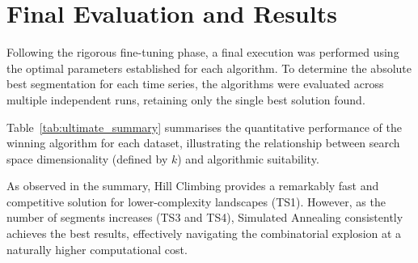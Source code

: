 \documentclass[12pt, a4paper]{article}
\begin{document}
\section{Final Evaluation and Results}

Following the rigorous fine-tuning phase, a final execution was performed using the
optimal parameters established for each algorithm. To determine the absolute best
segmentation for each time series, the algorithms were evaluated across multiple
independent runs, retaining only the single best solution found.

Table~\ref{tab:ultimate_summary} summarises the quantitative performance of the winning
algorithm for each dataset, illustrating the relationship between search space
dimensionality (defined by $k$) and algorithmic suitability.

\renewcommand{\arraystretch}{1.3}
\begin{table}[H]
  \centering
  \caption{Summary of the best solutions found across all datasets.}
  \label{tab:ultimate_summary}
\end{table}
\renewcommand{\arraystretch}{1}

As observed in the summary, Hill Climbing provides a remarkably fast and competitive
solution for lower-complexity landscapes (TS1). However, as the number of segments
increases (TS3 and TS4), Simulated Annealing consistently achieves the best results,
effectively navigating the combinatorial explosion at a naturally higher computational
cost.
\end{document}
